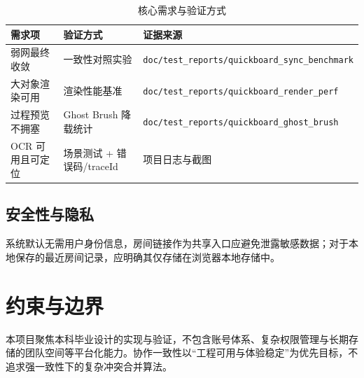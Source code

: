 \begin{table}[htbp]
  \centering
  \caption{核心需求与验证方式}\label{tab:req-verify}
  \renewcommand{\arraystretch}{1.35}
  \begin{tabular}{lll}
    \toprule
    \textbf{需求项} & \textbf{验证方式} & \textbf{证据来源} \\
    \midrule
    弱网最终收敛 & 一致性对照实验 & \texttt{doc/test\_reports/quickboard\_sync\_benchmark} \\
    大对象渲染可用 & 渲染性能基准 & \texttt{doc/test\_reports/quickboard\_render\_perf} \\
    过程预览不拥塞 & Ghost Brush 降载统计 & \texttt{doc/test\_reports/quickboard\_ghost\_brush} \\
    OCR 可用且可定位 & 场景测试 + 错误码/traceId & 项目日志与截图 \\
    \bottomrule
  \end{tabular}
\end{table}

\subsection{安全性与隐私}
系统默认无需用户身份信息，房间链接作为共享入口应避免泄露敏感数据；对于本地保存的最近房间记录，应明确其仅存储在浏览器本地存储中。

\section{约束与边界}
本项目聚焦本科毕业设计的实现与验证，不包含账号体系、复杂权限管理与长期存储的团队空间等平台化能力。协作一致性以“工程可用与体验稳定”为优先目标，不追求强一致性下的复杂冲突合并算法。
